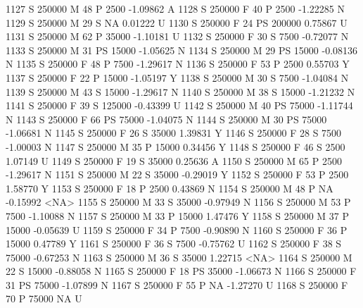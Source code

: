 \documentclass{article}
\begin{document}
\begin{Schunk}
\begin{Soutput}
1127      S     250000   M  48         P   2500  -1.09862    A
1128      S     250000   F  40         P   2500  -1.22285    N
1129      S     250000   M  29         S     NA   0.01222    U
1130      S     250000   F  24        PS 200000   0.75867    U
1131      S     250000   M  62         P  35000  -1.10181    U
1132      S     250000   F  30         S   7500  -0.72077    N
1133      S     250000   M  31        PS  15000  -1.05625    N
1134      S     250000   M  29        PS  15000  -0.08136    N
1135      S     250000   F  48         P   7500  -1.29617    N
1136      S     250000   F  53         P   2500   0.55703    Y
1137      S     250000   F  22         P  15000  -1.05197    Y
1138      S     250000   M  30         S   7500  -1.04084    N
1139      S     250000   M  43         S  15000  -1.29617    N
1140      S     250000   M  38         S  15000  -1.21232    N
1141      S     250000   F  39         S 125000  -0.43399    U
1142      S     250000   M  40        PS  75000  -1.11744    N
1143      S     250000   F  66        PS  75000  -1.04075    N
1144      S     250000   M  30        PS  75000  -1.06681    N
1145      S     250000   F  26         S  35000   1.39831    Y
1146      S     250000   F  28         S   7500  -1.00003    N
1147      S     250000   M  35         P  15000   0.34456    Y
1148      S     250000   F  46         S   2500   1.07149    U
1149      S     250000   F  19         S  35000   0.25636    A
1150      S     250000   M  65         P   2500  -1.29617    N
1151      S     250000   M  22         S  35000  -0.29019    Y
1152      S     250000   F  53         P   2500   1.58770    Y
1153      S     250000   F  18         P   2500   0.43869    N
1154      S     250000   M  48         P     NA  -0.15992 <NA>
1155      S     250000   M  33         S  35000  -0.97949    N
1156      S     250000   M  53         P   7500  -1.10088    N
1157      S     250000   M  33         P  15000   1.47476    Y
1158      S     250000   M  37         P  15000  -0.05639    U
1159      S     250000   F  34         P   7500  -0.90890    N
1160      S     250000   F  36         P  15000   0.47789    Y
1161      S     250000   F  36         S   7500  -0.75762    U
1162      S     250000   F  38         S  75000  -0.67253    N
1163      S     250000   M  36         S  35000   1.22715 <NA>
1164      S     250000   M  22         S  15000  -0.88058    N
1165      S     250000   F  18        PS  35000  -1.06673    N
1166      S     250000   F  31        PS  75000  -1.07899    N
1167      S     250000   F  55         P     NA  -1.27270    U
1168      S     250000   F  70         P  75000        NA    U

\end{Soutput}
\end{Schunk}
\end{document}
